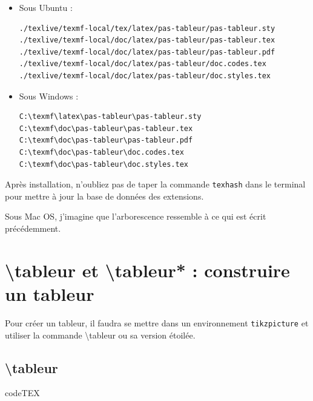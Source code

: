 \documentclass[a4paper,french]{article}
\begin{document}
\begin{itemize}
\item Sous Ubuntu :

\begin{verbatim}
./texlive/texmf-local/tex/latex/pas-tableur/pas-tableur.sty
./texlive/texmf-local/doc/latex/pas-tableur/pas-tableur.tex
./texlive/texmf-local/doc/latex/pas-tableur/pas-tableur.pdf
./texlive/texmf-local/doc/latex/pas-tableur/doc.codes.tex
./texlive/texmf-local/doc/latex/pas-tableur/doc.styles.tex
\end{verbatim}

\item Sous Windows :

\begin{verbatim}
C:\texmf\latex\pas-tableur\pas-tableur.sty
C:\texmf\doc\pas-tableur\pas-tableur.tex
C:\texmf\doc\pas-tableur\pas-tableur.pdf
C:\texmf\doc\pas-tableur\doc.codes.tex
C:\texmf\doc\pas-tableur\doc.styles.tex
\end{verbatim}
\end{itemize}

\medskip

Apr\`es installation, n'oubliez pas de taper la commande \texttt{texhash} dans le terminal pour mettre \`a jour la base de donn\'ees des extensions.

\bigskip 

Sous Mac OS, j'imagine que l'arborescence ressemble \`a ce qui est \'ecrit pr\'ec\'edemment.


\section{\textbackslash tableur et \textbackslash tableur* : construire un tableur}

Pour cr\'eer un tableur, il faudra se mettre dans un environnement \texttt{tikzpicture} et utiliser la commande \textbackslash tableur ou sa version \'etoil\'ee.

\subsection{\textbackslash tableur}

\begin{tcblisting}{codeTEX}
\end{tcblisting}

\bigskip
\end{document}
